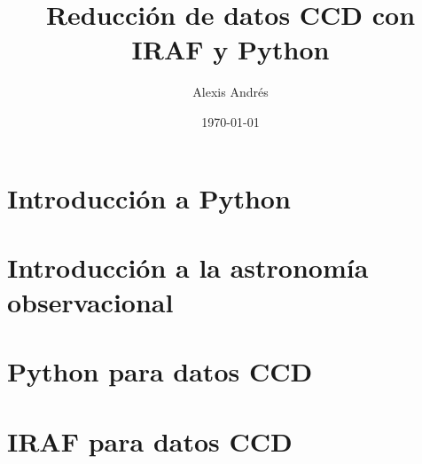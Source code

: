 \documentclass[11pt, letterpaper]{report}
\title{\bf\Huge Reducción de datos CCD con IRAF y Python}
\author{Alexis Andrés}
\date{\today}
\begin{document}
\renewcommand*\thepart{\arabic{part}}
\renewcommand{\partname}{Unidad}
\renewcommand{\chaptername}{Clase}
\renewcommand{\tablename}{Tabla}
\renewcommand\bibname{Referencias de la \partname ~\thepart}

\maketitle

\tableofcontents

\part{Introducción a Python}








\part{Introducción a la astronomía observacional}




\printbibliography[segment=\therefsegment]


\part{Python para datos CCD}






\part{IRAF para datos CCD}




\end{document}
